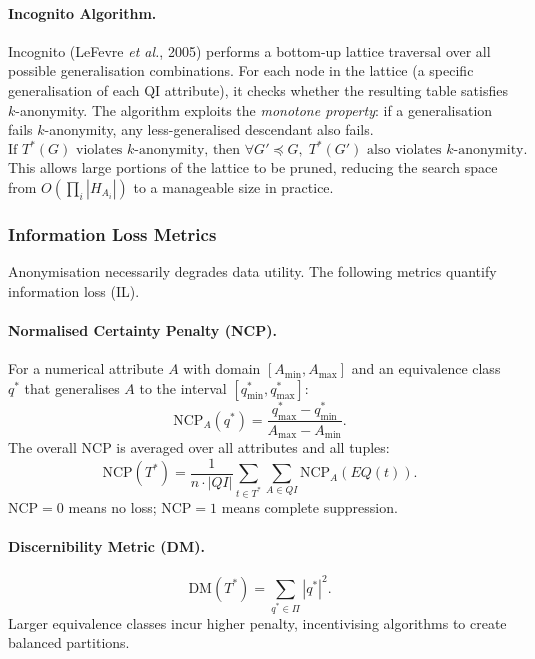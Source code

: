 \paragraph{Incognito Algorithm.}

Incognito (LeFevre \emph{et al.}, 2005) performs a bottom-up lattice traversal over all possible generalisation combinations. For each node in the lattice (a specific generalisation of each QI attribute), it checks whether the resulting table satisfies $k$-anonymity. The algorithm exploits the \emph{monotone property}: if a generalisation fails $k$-anonymity, any less-generalised descendant also fails.
\[
  \text{If } T^*(G) \text{ violates } k\text{-anonymity, then } \forall G' \preceq G,\; T^*(G') \text{ also violates } k\text{-anonymity.}
\]
This allows large portions of the lattice to be pruned, reducing the search space from $O(\prod_i |H_{A_i}|)$ to a manageable size in practice.

\subsubsection{Information Loss Metrics}
\label{sec:info_loss_metrics}

Anonymisation necessarily degrades data utility. The following metrics quantify information loss (IL).

\paragraph{Normalised Certainty Penalty (NCP).}
For a numerical attribute $A$ with domain $[A_{\min}, A_{\max}]$ and an equivalence class $q^*$ that generalises $A$ to the interval $[q^*_{\min}, q^*_{\max}]$:
\[
  \mathrm{NCP}_A(q^*) = \frac{q^*_{\max} - q^*_{\min}}{A_{\max} - A_{\min}}.
\]
The overall NCP is averaged over all attributes and all tuples:
\[
  \mathrm{NCP}(T^*) = \frac{1}{n \cdot |QI|} \sum_{t \in T^*} \sum_{A \in QI} \mathrm{NCP}_A(EQ(t)).
\]
$\mathrm{NCP} = 0$ means no loss; $\mathrm{NCP} = 1$ means complete suppression.

\paragraph{Discernibility Metric (DM).}
\[
  \mathrm{DM}(T^*) = \sum_{q^* \in \Pi} |q^*|^2.
\]
Larger equivalence classes incur higher penalty, incentivising algorithms to create balanced partitions.

